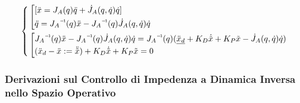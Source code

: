 \[
	\left\{
	\begin{aligned}
	&\left[
	\begin{aligned}
	&[\ddot{x} = J_A(q)\ddot{q} + \dot{J}_A(q,\dot{q})\dot{q}]\\
	&\ddot{q} = \inv{J_A}(q)\ddot{x} - \inv{J_A}(q)\dot{J}_A(q,\dot{q})\dot{q}
	\end{aligned}
	\right.\\
	&\left[
	\begin{aligned}
	&\inv{J_A}(q)\ddot{x} - \inv{J_A}(q)\dot{J}_A(q,\dot{q})\dot{q} = \inv{J_A}(q)(\underline{\ddot{x}_d} + K_D\dot{\tilde{x}} + K_P\tilde{x} - \dot{J}_A(q,\dot{q})\dot{q})\\
	&(\ddot{x}_d-\ddot{x} := \ddot{\tilde{x}}) + K_D\dot{\tilde{x}} + K_P\tilde{x} = 0
	\end{aligned}
	\right.
	\end{aligned}
	\right.
\]

\subsubsection{Derivazioni sul Controllo di Impedenza a Dinamica Inversa nello Spazio Operativo}

